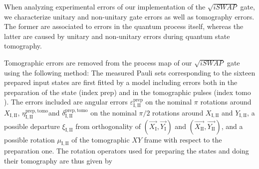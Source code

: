When analyzing experimental errors of our implementation of the $\sqrt{iSWAP}$ gate, we characterize unitary and non-unitary gate errors as well as tomography errors. The former are associated to errors in the quantum process itself, whereas the latter are caused by unitary and non-unitary errors during quantum state tomography.

\smallskip

Tomographic errors are removed from the process map of our $\sqrt{iSWAP}$
gate using the following method: The measured Pauli sets corresponding
to the sixteen prepared input states are first fitted by a model including
errors both in the preparation of the state (index $\mathrm{prep}$) and in
the tomographic pulses (index $\mathrm{tomo}$). The errors included are angular
errors $\varepsilon_{\mathrm{I,II}}^{\mathrm{prep}}$ on the nominal
$\pi$ rotations around $X_{\mathrm{I,II}}$, $\eta_{\mathrm{I,II}}^{\mathrm{prep,tomo}}$and
$\delta_{\mathrm{I,II}}^{\mathrm{prep,tomo}}$ on the nominal $\pi/2$
rotations around $X_{\mathrm{I,II}}$ and $Y_{\mathrm{I,II}}$, a
possible departure $\xi_{\mathrm{I,II}}$ from orthogonality of $\left(\overrightarrow{X_{\mathrm{I}}},\overrightarrow{Y_{\mathrm{I}}}\right)$ and $\left(\overrightarrow{X_{\mathrm{II}}},\overrightarrow{Y_{\mathrm{II}}}\right)$,
and a possible rotation $\mu_{\mathrm{I,II}}$ of the tomographic
$XY$ frame with respect to the preparation one. The rotation operators
used for preparing the states and doing their tomography are thus
given by

